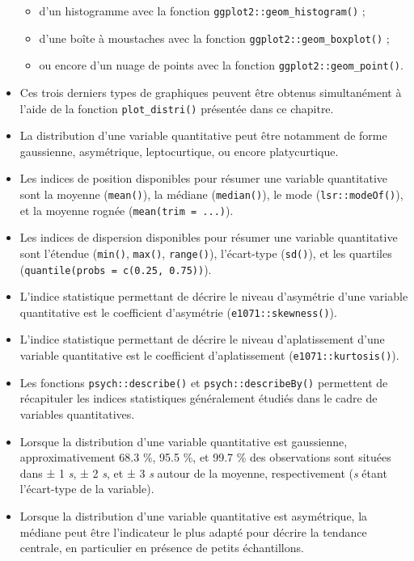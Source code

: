 \documentclass[
  french,
]{book}
\providecommand{\tightlist}{%
  \setlength{\itemsep}{0pt}\setlength{\parskip}{0pt}}
\begin{document}
\begin{itemize}
  \begin{itemize}
  \tightlist
  \item
    d'un histogramme avec la fonction \texttt{ggplot2::geom\_histogram()} ;
  \item
    d'une boîte à moustaches avec la fonction \texttt{ggplot2::geom\_boxplot()} ;
  \item
    ou encore d'un nuage de points avec la fonction \texttt{ggplot2::geom\_point()}.
  \end{itemize}
\item
  Ces trois derniers types de graphiques peuvent être obtenus simultanément à l'aide de la fonction \texttt{plot\_distri()} présentée dans ce chapitre.
\item
  La distribution d'une variable quantitative peut être notamment de forme gaussienne, asymétrique, leptocurtique, ou encore platycurtique.
\item
  Les indices de position disponibles pour résumer une variable quantitative sont la moyenne (\texttt{mean()}), la médiane (\texttt{median()}), le mode (\texttt{lsr::modeOf()}), et la moyenne rognée (\texttt{mean(trim\ =\ ...)}).
\item
  Les indices de dispersion disponibles pour résumer une variable quantitative sont l'étendue (\texttt{min()}, \texttt{max()}, \texttt{range()}), l'écart-type (\texttt{sd()}), et les quartiles (\texttt{quantile(probs\ =\ c(0.25,\ 0.75))}).
\item
  L'indice statistique permettant de décrire le niveau d'asymétrie d'une variable quantitative est le coefficient d'asymétrie (\texttt{e1071::skewness()}).
\item
  L'indice statistique permettant de décrire le niveau d'aplatissement d'une variable quantitative est le coefficient d'aplatissement (\texttt{e1071::kurtosis()}).
\item
  Les fonctions \texttt{psych::describe()} et \texttt{psych::describeBy()} permettent de récapituler les indices statistiques généralement étudiés dans le cadre de variables quantitatives.
\item
  Lorsque la distribution d'une variable quantitative est gaussienne, approximativement 68.3 \%, 95.5 \%, et 99.7 \% des observations sont situées dans ± 1 \emph{s}, ± 2 \emph{s}, et ± 3 \emph{s} autour de la moyenne, respectivement (\emph{s} étant l'écart-type de la variable).
\item
  Lorsque la distribution d'une variable quantitative est asymétrique, la médiane peut être l'indicateur le plus adapté pour décrire la tendance centrale, en particulier en présence de petits échantillons.

\end{itemize}
\end{document}
